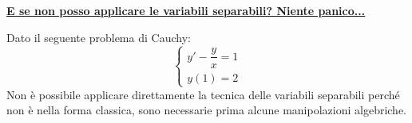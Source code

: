 \documentclass[a4paper]{article}
\newcommand{\example}[1]{\textcolor{Green4}{\textbf{#1}}}
\begin{document}
	\begin{flushleft}
		\example{\underline{E se non posso applicare le variabili separabili? Niente panico...}}
	\end{flushleft}

	\noindent
	Dato il seguente problema di Cauchy:
	\begin{equation*}
		\begin{cases}
			y' - \dfrac{y}{x} = 1 \\
			y\left(1\right) = 2
		\end{cases}
	\end{equation*}
	Non è possibile applicare direttamente la tecnica delle variabili separabili perché non è nella forma classica, sono necessarie prima alcune manipolazioni algebriche.\newline
\end{document}
